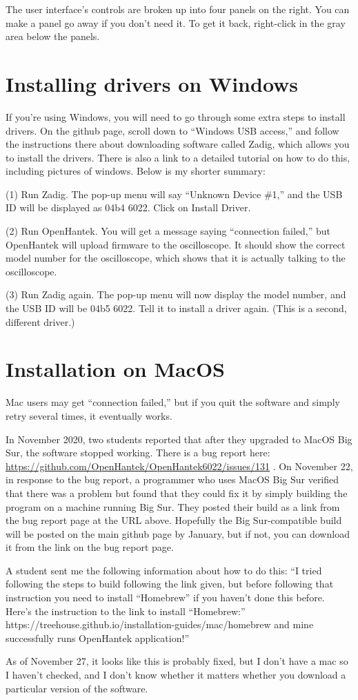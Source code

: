 The user interface's controls are broken up into four panels on the
right.  You can make a panel go away if you don't need it. To get it
back, right-click in the gray area below the panels.

\section*{Installing drivers on Windows}

If you're using Windows, you will need to go through some extra steps to install drivers.
On the github page, scroll down to
``Windows USB access,'' and follow the instructions there about downloading software called Zadig,
which allows you to install the drivers. There is also a link to a detailed tutorial
on how to do this, including pictures of windows. Below is my shorter summary:

(1) Run Zadig. The pop-up menu will say ``Unknown Device \#1,'' and
the USB ID will be displayed as 04b4 6022. Click on Install Driver.

(2) Run OpenHantek. You will get a message saying ``connection failed,'' but OpenHantek
will upload firmware to the oscilloscope. It should show the correct model number for
the oscilloscope, which shows that it is actually talking to the oscilloscope.

(3) Run Zadig again. The pop-up menu will now display the model number, and
the USB ID will be 04b5 6022. Tell it to install a driver again. (This is a
second, different driver.)


\section*{Installation on MacOS}

Mac users may get ``connection failed,'' but if you quit
the software and simply retry several times, it eventually works.

In November 2020, two students reported that after they upgraded to MacOS Big Sur,
the software stopped working. There is a bug report here: \url{https://github.com/OpenHantek/OpenHantek6022/issues/131} .
On November 22, in response to the bug report, a programmer who uses MacOS Big Sur verified that there was a problem
but found that they could fix it by simply building the program on a machine running
Big Sur. They posted their build as a link from the bug report page at the URL above. Hopefully the
Big Sur-compatible build will be posted on the main github page by January, but if not, you can
download it from the link on the bug report page.

A student sent me the following information about how to do this:
``I tried following the steps to build following the link given, but
before following that instruction you need to install ``Homebrew'' if
you haven't done this before.
Here's the instruction to the link to install ``Homebrew:''
https://treehouse.github.io/installation-guides/mac/homebrew
and mine successfully runs OpenHantek application!''

As of November 27, it looks like this is probably fixed, but I don't have a mac so I haven't
checked, and I don't know whether it matters whether you download a particular version of the software.

